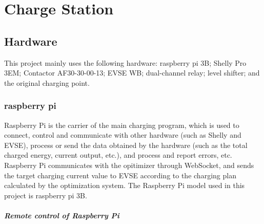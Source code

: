 \documentclass[
english,
ruledheaders=section,%
class=report,%
thesis={type=Report},%
accentcolor=9c,%
custommargins=true,%
marginpar=false,%
parskip=half-,%
fontsize=11pt,%
logofile={img/tuda_logo.pdf}, %
]{tudapub}
\begin{document}
    \chapter{Charge Station}
    \section{Hardware}
    \label{sec:CPHardware}

    This project mainly uses the following hardware: raspberry pi 3B; Shelly Pro 3EM; Contactor AF30-30-00-13; EVSE WB; dual-channel relay; level shifter; and the original charging point.
    \subsection{raspberry pi}
    \label{subsec:raspberry pi}

    Raspberry Pi is the carrier of the main charging program, which is used to connect, control and communicate with other hardware (such as Shelly and EVSE), process or send the data obtained by the hardware (such as the total charged energy, current output, etc.), and process and report errors, etc. Raspberry Pi communicates with the opitimizer through WebSocket, and sends the target charging current value to EVSE according to the charging plan calculated by the optimization system.
    The Raspberry Pi model used in this project is raspberry pi 3B.

    \paragraph{Remote control of Raspberry Pi}
\end{document}
